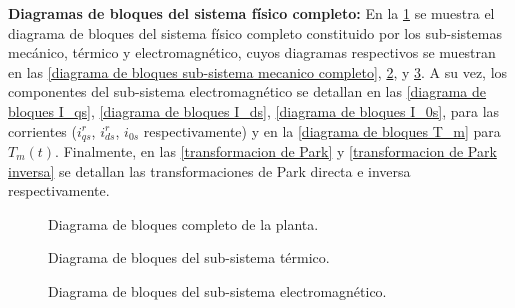 \documentclass[a4paper, 10pt, onecolumn,journal]{ieeeconf}
\begin{document}
\textbf{Diagramas de bloques del sistema físico completo: } En la \cref{diagrama de bloques del sistema fisico} se muestra
el diagrama de bloques del sistema físico completo constituido por los sub-sistemas mecánico, térmico y electromagnético, cuyos diagramas
respectivos se muestran en las \cref{diagrama de bloques sub-sistema mecanico completo}, \cref{subsistema termico},
y \cref{sub-sistema electromagnetico}. A su vez, los componentes del sub-sistema electromagnético se detallan
en las \cref{diagrama de bloques I_qs}, \cref{diagrama de bloques I_ds}, \cref{diagrama de bloques I_0s}, para las corrientes ($i^r_{qs}$, $i^r_{ds}$, $i_{0s}$ respectivamente) y en la \cref{diagrama de bloques T_m} para $T_m(t)$.
Finalmente, en las \cref{transformacion de Park} y \cref{transformacion de Park inversa} se detallan las transformaciones de Park directa e inversa respectivamente.

\begin{figure}[H]
    \centering
    \begin{adjustbox}{max width=\columnwidth}
    \end{adjustbox}
    \caption{Diagrama de bloques completo de la planta.}
    \label{diagrama de bloques del sistema fisico}
\end{figure}

\begin{figure}[H]
    \centering
    \begin{adjustbox}{scale=0.7,max width=\columnwidth}
    \end{adjustbox}
    \caption{Diagrama de bloques del sub-sistema térmico.}
    \label{subsistema termico}
\end{figure}

\begin{figure}[H]
    \centering
    \begin{adjustbox}{scale=0.7,max width=\columnwidth}
    \end{adjustbox}
    \caption{Diagrama de bloques del sub-sistema electromagnético.}
    \label{sub-sistema electromagnetico}
\end{figure}
\end{document}
